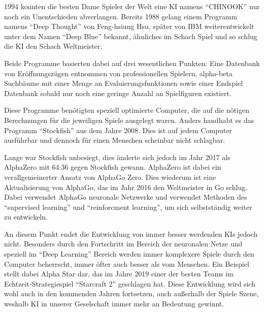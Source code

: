 1994 konnten die besten Dame Spieler der Welt eine KI namens ``CHINOOK'' nur noch ein Unentschieden abverlangen. Bereits 1988 gelang einem Programm namens ``Deep Thought'' von Feng-hsiung Hsu, später von IBM weiterentwickelt unter dem Namen ``Deep Blue'' bekannt, ähnliches im Schach Spiel und so schlug die KI den Schach Weltmeister.

Beide Programme basierten dabei auf drei wesentlichen Punkten: Eine Datenbank von Eröffnungszügen entnommen von professionellen Spielern, alpha-beta Suchbäume mit einer Menge an Evaluierungsfunktionen sowie einer Endspiel Datenbank sobald nur noch eine geringe Anzahl an Spielfiguren existiert.


Diese Programme benötigten speziell optimierte Computer, die auf die nötigen Berechnungen für die jeweiligen Spiele ausgelegt waren. Anders handhabt es das Programm ``Stockfish'' aus dem Jahre 2008. Dies ist auf jedem Computer ausführbar und dennoch für einen Menschen scheinbar nicht schlagbar.

Lange war Stockfish unbesiegt, dies änderte sich jedoch im Jahr 2017 als AlphaZero mit 64:36 gegen Stockfish gewann. AlphaZero ist dabei ein verallgemeinerter Ansatz von AlphaGo Zero. Dies wiederum ist eine Aktualisierung von AlphaGo, das im Jahr 2016 den Weltmeister in Go schlug. Dabei verwendet AlphaGo neuronale Netzwerke und verwendet Methoden des ``supervised learning'' und ``reinforcment learning'', um sich selbstständig weiter zu entwickeln.


An diesem Punkt endet die Entwicklung von immer besser werdenden KIs jedoch nicht. Besonders durch den Fortschritt im Bereich der neuronalen Netze und speziell im ``Deep Learning'' Bereich werden immer komplexere Spiele durch den Computer beherrscht, immer öfter auch besser als vom Menschen. Ein Beispiel stellt dabei Alpha Star dar, das im Jahre 2019 einer der besten Teams im Echtzeit-Strategiespiel ``Starcraft 2'' geschlagen hat. Diese Entwicklung wird sich wohl auch in den kommenden Jahren fortsetzen, auch außerhalb der Spiele Szene, weshalb KI in unserer Geselschaft immer mehr an Bedeutung gewinnt.





